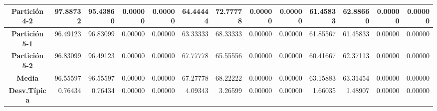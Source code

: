 \documentclass[a4paper,11pt]{article}
\begin{document}
\begin{table}[H]
\begin{adjustbox}{width=1.1\textwidth}
\begin{tabular}{|c|r|r|r|r|r|r|r|r|r|r|r|r|}
    \textbf{Partición 4-2} & 97.88732 & 95.43860 & 0.00000 & 0.00000 & 64.44444 & 72.77778 & 0.00000 & 0.00000 & 61.45833 & 62.88660 & 0.00000 & 0.00000 \\ \hline
    \textbf{Partición 5-1} & 96.49123 & 96.83099 & 0.00000 & 0.00000 & 63.33333 & 68.33333 & 0.00000 & 0.00000 & 61.85567 & 61.45833 & 0.00000 & 0.00000 \\ \hline
    \textbf{Partición 5-2} & 96.83099 & 96.49123 & 0.00000 & 0.00000 & 67.77778 & 65.55556 & 0.00000 & 0.00000 & 60.41667 & 62.37113 & 0.00000 & 0.00000 \\ \hline
    \textbf{Media} & 96.55597 & 96.55597 & 0.00000 & 0.00000 & 67.27778 & 68.22222 & 0.00000 & 0.00000 & 63.15883 & 63.31454 & 0.00000 & 0.00000 \\ \hline
    \textbf{Desv.Típica} & 0.76434 & 0.76434 & 0.00000 & 0.00000 & 4.09343 & 3.26599 & 0.00000 & 0.00000 & 1.66035 & 1.48907 & 0.00000 & 0.00000 \\ \hline
    \end{tabular}
    \end{adjustbox}
    \label{NN3}
  \end{table}
  
\end{document}

